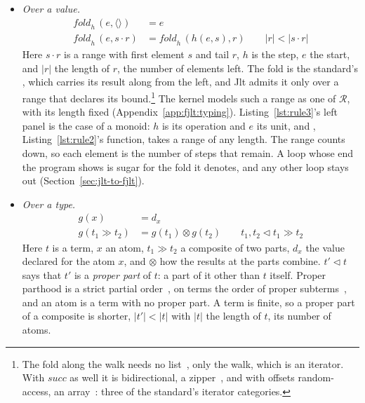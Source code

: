 \begin{itemize}
\item \emph{Over a value.}
\begin{equation}
\label{eq:fold}
\begin{aligned}
\mathit{fold}_h\,(e, \langle\rangle) &= e \\
\mathit{fold}_h\,(e, s \cdot r) &= \mathit{fold}_h\,(h(e, s), r) \qquad |r| < |s \cdot r|
\end{aligned}
\end{equation}
Here $s \cdot r$ is a range with first element $s$ and tail $r$, $h$ is the step, $e$ the start, and $|r|$ the length of $r$, the number of elements left.
The fold is the standard's , which carries its result along from the left, and Jlt admits it only over a range that declares its bound.\footnote{The fold along the walk needs no list~\cite{gibbons1996third}, only the walk, which is an iterator.
With $\mathit{succ}$ as well it is bidirectional, a zipper~\cite{huet1997zipper}, and with offsets random-access, an array~\cite[\S 2.2.2]{knuth1997art1}: three of the standard's iterator categories.}
The kernel models such a range as one of $\mathcal{R}$, with its length fixed (Appendix~\ref{app:fjlt:typing}).
Listing~\ref{lst:rule3}'s left panel is the case of a monoid: $h$ is its operation and $e$ its unit, and , Listing~\ref{lst:rule2}'s function, takes a range of any length.
The range counts down, so each element is the number of steps that remain.
A loop whose end the program shows is sugar for the fold it denotes, and any other loop stays out (Section~\ref{sec:jlt-to-fjlt}).
\item \emph{Over a type.}
\begin{equation}
\label{eq:cata}
\begin{aligned}
g(x) &= d_x \\
g(t_1 \gg t_2) &= g(t_1) \otimes g(t_2) \qquad t_1, t_2 \triangleleft t_1 \gg t_2
\end{aligned}
\end{equation}
Here $t$ is a term, $x$ an atom, $t_1 \gg t_2$ a composite of two parts, $d_x$ the value declared for the atom $x$, and $\otimes$ how the results at the parts combine.
$t' \triangleleft t$ says that $t'$ is a \emph{proper part} of $t$: a part of it other than $t$ itself.
Proper parthood is a strict partial order~\cite{simons1987parts}, on terms the order of proper subterms~\cite{baader1998term}, and an atom is a term with no proper part.
A term is finite, so a proper part of a composite is shorter, $|t'| < |t|$ with $|t|$ the length of $t$, its number of atoms.

\end{itemize}
